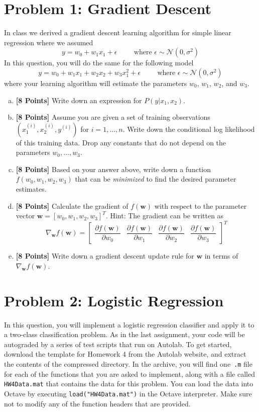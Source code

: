 \documentclass{article}
\newcommand \code [1]{{\tt #1}}
\newcommand \bs [1]{\boldsymbol{#1}}
\begin{document}
\section*{Problem 1: Gradient Descent}
In class we derived a gradient descent learning algorithm for simple linear regression where we assumed
\[y= w_0 + w_1 x_1 + \epsilon  \hspace{1cm}  \text{where } \epsilon \sim \mathcal{N}(0, \sigma^2) \]
In this question, you will do the same for the following model
$$ y = w_0 + w_1 x_1 + w_2 x_2 + w_3 x_1^2 + \epsilon \hspace{1cm} \text{where } \epsilon \sim \mathcal{N}(0, \sigma^2) $$
where your learning algorithm will estimate the parameters $w_0$, $w_1$, $w_2$, and $w_3$.
\begin{enumerate}[(a)]
\item {\bf [8 Points]} Write down an expression for $P(y \vert x_1, x_2)$.
\item {\bf [8 Points]} Assume you are given a set of training observations $(x_1^{(i)}, x_2^{(i)}, y^{(i)})$ for $i = 1,\ldots,n$.   Write down the conditional log likelihood of this training data.   Drop any constants that do not depend on the parameters $w_0, \ldots, w_3$.
\item {\bf [8 Points]} Based on your answer above, write down a function $f(w_0, w_1, w_2, w_3)$ that can be \emph{minimized} to find the desired parameter estimates.  
\item {\bf [8 Points]} Calculate the gradient of $f(\bs{w})$ with respect to the parameter vector $\bs{w} = [w_0, w_1, w_2, w_3]^T$. Hint: The gradient can be written as $$
 \nabla_{\bs{w}} f(\bs{w}) = \left[ \begin{array}{cccc}
\dfrac{\partial f(\bs{w})}{\partial w_0} & \dfrac{\partial f(\bs{w})}{\partial w_1}  & \dfrac{\partial f(\bs{w})}{\partial w_2} & \dfrac{\partial f(\bs{w})}{\partial w_3}
\end{array} \right]^T $$
\item {\bf [8 Points]} Write down a gradient descent update rule for $\bs{w}$ in terms of $ \nabla_{\bs{w}} f(\bs{w})$.
\end{enumerate}

\section*{Problem 2: Logistic Regression}

In this question, you will implement a logistic regression classifier and apply it to a two-class classification problem. As in the last assignment, your code will be autograded by a series of test scripts that run on Autolab. To get started, download the template for Homework 4 from the Autolab website, and extract the contents of the compressed directory. In the archive, you will find one~\code{.m} file for each of the functions that you are asked to implement, along with a file called \code{HW4Data.mat} that contains the data for this problem. You can load the data into Octave by executing \code{load("HW4Data.mat")} in the Octave interpreter. Make sure not to modify any of the function headers that are provided.
\end{document}
